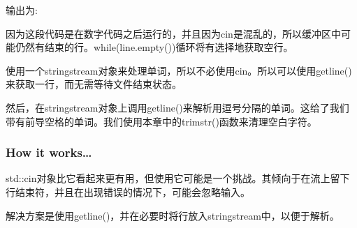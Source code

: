 \begin{itemize}
输出为:


因为这段代码是在数字代码之后运行的，并且因为cin是混乱的，所以缓冲区中可能仍然有结束的行。while(line.empty())循环将有选择地获取空行。

使用一个stringstream对象来处理单词，所以不必使用cin。所以可以使用getline()来获取一行，而无需等待文件结束状态。

然后，在stringstream对象上调用getline()来解析用逗号分隔的单词。这给了我们带有前导空格的单词。我们使用本章中的trimstr()函数来清理空白字符。
\end{itemize}

\subsubsection{How it works…}


std::cin对象比它看起来更有用，但使用它可能是一个挑战。其倾向于在流上留下行结束符，并且在出现错误的情况下，可能会忽略输入。

解决方案是使用getline()，并在必要时将行放入stringstream中，以便于解析。











